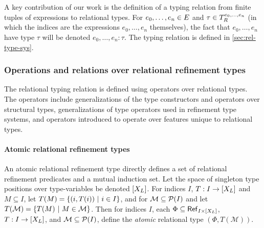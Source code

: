A key contribution of our work is the definition of a typing relation
from finite tuples of expressions to relational types.
%
For $e_0, \ldots, e_n \in E$ and
$\tau \in T_{R}^{e_0, \ldots, e_n}$ (in which the indices are the
expressions $e_0, \ldots, e_n$ themselves), the fact that
$e_0, \ldots, e_n$ have type $\tau$ will be denoted
$e_0, \ldots, e_n : \tau$.
%
The typing relation is defined in \autoref{sec:rel-type-sys}.

\subsubsection{Operations and relations over relational refinement types}
\label{sec:rel-type-ops}
The relational typing relation is defined using operators over
relational types.
%
The operators include generalizations of the type constructors and
operators over structural types, generalizations of type operators
used in refinement type systems, and operators introduced to operate
over features unique to relational types.

\paragraph{Atomic relational refinement types}
%
An atomic relational refinement type directly defines a set of
relational refinement predicates and a mutual induction set.
% 
Let the space of singleton type positions over type-variables be
denoted $[ X_L ]$.
%
For indices $I$, $T : I \to [ X_L ]$ and $M \subseteq I$, let
$T(M) = \{  (i, T(i)) \ |\  i \in I  \}$, and for
$\mathcal{M} \subseteq \mathcal{P}(I)$ and let
$T(\mathcal{M}) = \{  T(M) \ |\  M \in \mathcal{M} \}$.
%
Then for indices $I$, 
each $\Phi \subseteq \mathsf{Ref}_{ I \times [ X_L] }$,
$T : I \to [ X_L ]$, and $\mathcal{M} \subseteq \mathcal{P}(I)$, define
the \emph{atomic} relational type $(\Phi, T(\mathcal{M}))$.


